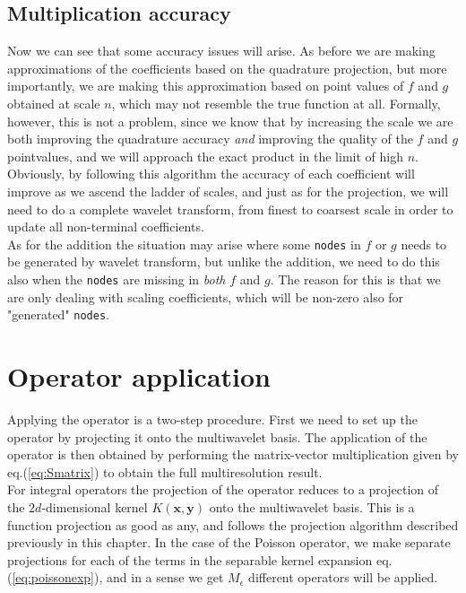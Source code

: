 \subsection*{Multiplication accuracy}
Now we can see that some accuracy issues will arise. As before we are making
approximations of the coefficients based on the quadrature projection, but
more importantly, we are making this approximation based on point values of
$f$ and $g$ obtained at scale $n$, which may not resemble the true function at 
all. Formally, however, this is not a
problem, since we know that by increasing the scale we are both improving the
quadrature accuracy \emph{and} improving the quality of the $f$ and $g$
pointvalues, and we will approach the exact product in the limit of high $n$. 
Obviously, by
following this algorithm the accuracy of each coefficient will improve as we
ascend the ladder of scales, and just as for the projection, we will need to do
a complete wavelet transform, from finest to coarsest scale in order to 
update all non-terminal coefficients.\\

\noindent
As for the addition the situation may arise where some \texttt{nodes} in $f$
or $g$ needs to be generated by wavelet transform, but unlike the addition,
we need to do this also when the \texttt{nodes} are missing in \emph{both} $f$
and $g$. The reason for this is that we are only dealing with scaling
coefficients, which will be non-zero also for "generated" \texttt{nodes}.

\section{Operator application}
Applying the operator is a two-step procedure. First we need to set up the
operator by projecting it onto the multiwavelet basis. The application of the 
operator is then obtained by performing the matrix-vector multiplication
given by eq.(\ref{eq:Smatrix}) to obtain the full multiresolution result.\\

\noindent
For integral operators the projection of the operator reduces to a projection
of the $2d$-dimensional kernel $K(\boldsymbol{x},\boldsymbol{y})$ onto the
multiwavelet basis. This is a function projection as good as any, and follows
the projection algorithm described previously in this chapter. In the case of
the Poisson operator, we make separate projections for each of the terms in
the separable kernel expansion eq.(\ref{eq:poissonexp}), and in a sense we get
$M_{\epsilon}$ different operators will be applied.\\

